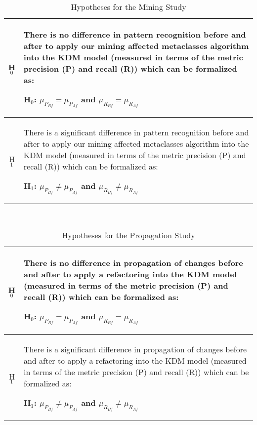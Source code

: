 \begin{table}[h]
\centering
\caption{Hypotheses for the Mining Study\label{tab:hypotheses}}
~~\\
\begin{tabularx}{
.46\textwidth}{|c|X|}
\hline \cellcolor[gray]{\shadow} H$_0$ & \footnotesize{ There is no difference in pattern recognition before and after to apply our mining affected metaclasses algorithm into the KDM model (measured in terms of the metric precision (P) and recall (R)) which can be formalized as: 

\textbf{H$_{0}$: $\mu_{P_{Bf}} = \mu_{P_{Af}}$ and $\mu_{R_{Bf}} = \mu_{R_{Af}}$}}
\\
\hline \cellcolor[gray]{\shadow} H$_1$ & \footnotesize{There is a significant difference in pattern recognition before and after to apply our mining affected metaclasses algorithm into the KDM model (measured in terms of the metric precision (P) and recall (R)) which can be formalized as: 

\textbf{H$_{1}$: $\mu_{P_{Bf}} \neq \mu_{P_{Af}}$ and $\mu_{R_{Bf}} \neq \mu_{R_{Af}}$}}
\\
\hline
\end{tabularx}
\end{table}

\begin{table}[h]
\centering
\caption{Hypotheses for the Propagation Study\label{tab:hypotheses}}
~~\\
\begin{tabularx}{
.46\textwidth}{|c|X|}
\hline \cellcolor[gray]{\shadow} H$_0$ & \footnotesize{ There is no difference in propagation of changes before and after to apply a refactoring into the KDM model (measured in terms of the metric precision (P) and recall (R)) which can be formalized as: 

\textbf{H$_{0}$: $\mu_{P_{Bf}} = \mu_{P_{Af}}$ and $\mu_{R_{Bf}} = \mu_{R_{Af}}$}}
\\
\hline \cellcolor[gray]{\shadow} H$_1$ & \footnotesize{There is a significant difference in propagation of changes before and after to apply a refactoring into the KDM model (measured in terms of the metric precision (P) and recall (R)) which can be formalized as:  

\textbf{H$_{1}$: $\mu_{P_{Bf}} \neq \mu_{P_{Af}}$ and $\mu_{R_{Bf}} \neq \mu_{R_{Af}}$}}
\\
\hline
\end{tabularx}
\end{table}

